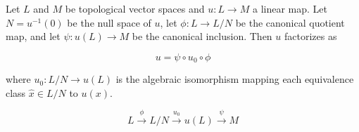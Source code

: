 Let $L$ and $M$ be topological vector spaces and $u: L \to M$ a linear map. Let $N = u^{-1}(0)$ be the null space of $u$, let $\phi: L \to L/N$ be the canonical quotient map, and let $\psi: u(L) \to M$ be the canonical inclusion. Then $u$ factorizes as

$$u = \psi \circ u_0 \circ \phi$$

where $u_0: L/N \to u(L)$ is the algebraic isomorphism mapping each equivalence class $\hat{x} \in L/N$ to $u(x)$.

$$L \xrightarrow{\phi} L/N \xrightarrow{u_0} u(L) \xrightarrow{\psi} M$$
